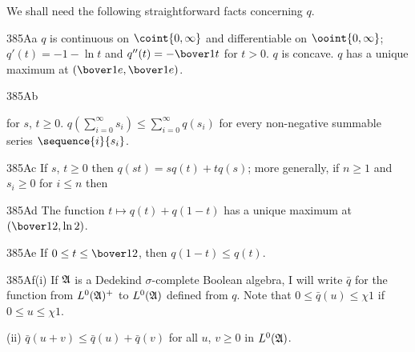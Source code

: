 \noindent We shall need the following straightforward facts concerning
$q$.
     
\spheader 385Aa $q$ is continuous on $\coint{0,\infty}$ and
differentiable on $\ooint{0,\infty}$;  $q'(t)=-1-\ln t$ and
$q''(t)=-\bover1t$ for $t>0$.    
$q$ is concave.   $q$ has a unique
maximum at $(\bover1e,\bover1e)$.
     
\spheader 385Ab 
     
     
\noindent for $s$, $t\ge 0$.    
$q(\sum_{i=0}^{\infty}s_i)\le\sum_{i=0}^{\infty}q(s_i)$ for every
non-negative summable series $\sequence{i}{s_i}$.
     
\spheader 385Ac If $s$, $t\ge 0$ then $q(st)=sq(t)+tq(s)$;  more
generally, if $n\ge 1$ and $s_i\ge 0$ for $i\le n$ then
     
     
\spheader 385Ad The function $t\mapsto q(t)+q(1-t)$ has a unique maximum
at $(\bover12,\ln 2)$.
     
\spheader 385Ae If $0\le t\le\bover12$, then $q(1-t)\le q(t)$.
     
\spheader 385Af(i) If $\frak A$ is a Dedekind $\sigma$-complete Boolean
algebra, I will write $\bar q$ for the function from $L^0(\frak A)^+$
to $L^0(\frak A)$ defined from $q$.   Note that
$0\le\bar q(u)\le\chi 1$ if $0\le u\le\chi 1$.
     
\quad(ii)
$\bar q(u+v)\le\bar q(u)+\bar q(v)$ for all $u$, $v\ge 0$ in
$L^0(\frak A)$.   
     
